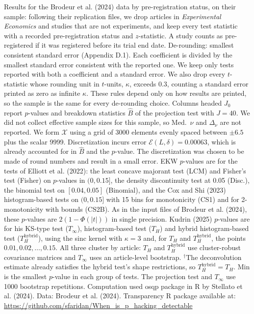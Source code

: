 \begin{table}[htbp]
\medskip
\begin{minipage}{\linewidth}
Results for the Brodeur et al. (2024) data by pre-registration status, on their sample: following their replication files, we drop articles in \textit{Experimental Economics} and studies that are not experiments, and keep every test statistic with a recorded pre-registration status and $z$-statistic.
A study counts as pre-registered if it was registered before its trial end date.
De-rounding: smallest consistent standard error (Appendix D.1). Each coefficient is divided by the smallest standard error consistent with the reported one.
We keep only tests reported with both a coefficient and a standard error. We also drop every $t$-statistic whose rounding unit in $t$-units, $\kappa$, exceeds 0.3, counting a standard error printed as zero as infinite $\kappa$. These rules depend only on how results are printed, so the sample is the same for every de-rounding choice.
Columns headed $J_0$ report $p$-values and breakdown statistics $\widehat{B}$ of the projection test with $J=40$.
We did not collect effective sample sizes for this sample, so Med.\ $\nu$ and $\Delta_\nu$ are not reported.
We form $\mathcal{X}$ using a grid of 3000 elements evenly spaced between $\pm 6.5$ plus the scalar 9999.
Discretization incurs error $\mathcal{E}(L,\delta)=0.00063$, which is already accounted for in $\widehat{B}$ and the $p$-value.
The discretization was chosen to be made of round numbers and result in a small error.
EKW $p$-values are for the tests of Elliott et al. (2022): the least concave majorant test (LCM) and Fisher's test (Fisher) on $p$-values in $(0,0.15]$, the density discontinuity test at 0.05 (Disc.), the binomial test on $[0.04,0.05]$ (Binomial), and the Cox and Shi (2023) histogram-based tests on $(0,0.15]$ with 15 bins for monotonicity (CS1) and for 2-monotonicity with bounds (CS2B).
As in the input files of Brodeur et al. (2024), these $p$-values are $2(1-\Phi(|t|))$ in single precision.
Kudrin (2025) $p$-values are for his KS-type test ($T_\infty$), histogram-based test ($T_H$) and hybrid histogram-based test ($T_H^{\mathrm{hybrid}}$), using the sinc kernel with $\kappa=3$ and, for $T_H$ and $T_H^{\mathrm{hybrid}}$, the points $0.01,0.02,\ldots,0.15$.
All three cluster by article: $T_H$ and $T_H^{\mathrm{hybrid}}$ use cluster-robust covariance matrices and $T_\infty$ uses an article-level bootstrap.
$^\dagger$The deconvolution estimate already satisfies the hybrid test's shape restrictions, so $T_H^{\mathrm{hybrid}}=T_H$.
Min is the smallest $p$-value in each group of tests.
The projection test and $T_\infty$ use 1000 bootstrap repetitions.
Computation used osqp package in R by Stellato et al. (2024). Data: Brodeur et al. (2024).
Transparency R package available at: \url{https://github.com/sfaridan/When_is_p_hacking_detectable}
\end{minipage}
\end{table}
